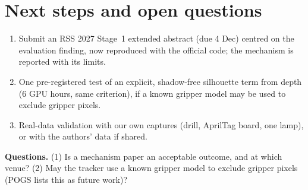 \documentclass[10pt,a4paper]{article}
\begin{document}
\section{Next steps and open questions}
\begin{enumerate}
\item Submit an RSS 2027 Stage~1 extended abstract (due 4 Dec) centred on the evaluation finding, now reproduced with the official code; the mechanism is reported with its limits.
\item One pre-registered test of an explicit, shadow-free silhouette term from depth (6 GPU hours, same criterion), if a known gripper model may be used to exclude gripper pixels.
\item Real-data validation with our own captures (drill, AprilTag board, one lamp), or with the authors' data if shared.
\end{enumerate}
\textbf{Questions.} (1) Is a mechanism paper an acceptable outcome, and at which venue? (2) May the tracker use a known gripper model to exclude gripper pixels (POGS lists this as future work)?
\end{document}
